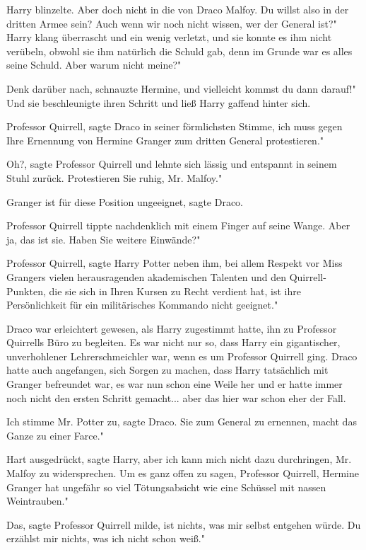 Harry blinzelte. \glqq Aber doch nicht in die von Draco Malfoy. Du willst also
in der dritten Armee sein? Auch wenn wir noch nicht wissen, wer der General
ist?" Harry klang überrascht und ein wenig verletzt, und sie konnte es ihm nicht
verübeln, obwohl sie ihm natürlich die Schuld gab, denn im Grunde war es alles
seine Schuld. \glqq Aber warum nicht meine?"

\glqq Denk darüber nach\grqq{}, schnauzte Hermine, \glqq und vielleicht kommst
du dann darauf!" Und sie beschleunigte ihren Schritt und ließ Harry gaffend
hinter sich.

\glqq Professor Quirrell\grqq{}, sagte Draco in seiner förmlichsten Stimme,
\glqq ich muss gegen Ihre Ernennung von Hermine Granger zum dritten General
protestieren."

\glqq Oh?\grqq{}, sagte Professor Quirrell und lehnte sich lässig und entspannt
in seinem Stuhl zurück. \glqq Protestieren Sie ruhig, Mr. Malfoy."

\glqq Granger ist für diese Position ungeeignet\grqq{}, sagte Draco.

Professor Quirrell tippte nachdenklich mit einem Finger auf seine Wange. \glqq
Aber ja, das ist sie. Haben Sie weitere Einwände?"

\glqq Professor Quirrell\grqq{}, sagte Harry Potter neben ihm, \glqq bei allem
Respekt vor Miss Grangers vielen herausragenden akademischen Talenten und den
Quirrell-Punkten, die sie sich in Ihren Kursen zu Recht verdient hat, ist ihre
Persönlichkeit für ein militärisches Kommando nicht geeignet."

Draco war erleichtert gewesen, als Harry zugestimmt hatte, ihn zu Professor
Quirrells Büro zu begleiten. Es war nicht nur so, dass Harry ein gigantischer,
unverhohlener Lehrerschmeichler war, wenn es um Professor Quirrell ging. Draco
hatte auch angefangen, sich Sorgen zu machen, dass Harry tatsächlich mit Granger
befreundet war, es war nun schon eine Weile her und er hatte immer noch nicht
den ersten Schritt gemacht... aber das hier war schon eher der Fall.

\glqq Ich stimme Mr. Potter zu\grqq{}, sagte Draco. \glqq Sie zum General zu
ernennen, macht das Ganze zu einer Farce."

\glqq Hart ausgedrückt\grqq{}, sagte Harry, \glqq aber ich kann mich nicht dazu
durchringen, Mr. Malfoy zu widersprechen. Um es ganz offen zu sagen, Professor
Quirrell, Hermine Granger hat ungefähr so viel Tötungsabsicht wie eine Schüssel
mit nassen Weintrauben."

\glqq Das\grqq{}, sagte Professor Quirrell milde, \glqq ist nichts, was mir
selbst entgehen würde. Du erzählst mir nichts, was ich nicht schon weiß."

